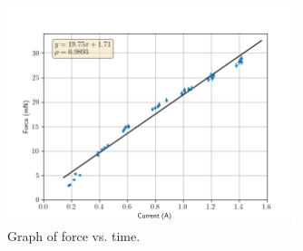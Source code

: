 \begin{figure}[b!]
	\centering
	\includegraphics[width=0.75\textwidth]{figures/procplot.png}
	\caption{Graph of force vs. time.}
	\label{fig:procplot}
\end{figure}
